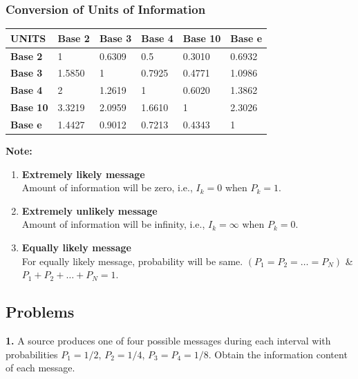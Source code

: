 \documentclass[12pt]{article}
\begin{document}
\subsubsection{Conversion of Units of Information}
\begin{table}[ht]
	\centering
	\renewcommand{\arraystretch}{1.3}
	\begin{tabular}{|l|l|l|l|l|l|}
		\hline
		\rowcolor{black!10}
		\textbf{UNITS}   & \textbf{Base 2} & \textbf{Base 3} & \textbf{Base 4} & \textbf{Base 10} & \textbf{Base e} \\ \hline
		\textbf{Base 2}  & 1               & 0.6309          & 0.5             & 0.3010           & 0.6932          \\ \hline
		\textbf{Base 3}  & 1.5850          & 1               & 0.7925          & 0.4771           & 1.0986          \\ \hline
		\textbf{Base 4}  & 2               & 1.2619          & 1               & 0.6020           & 1.3862          \\ \hline
		\textbf{Base 10} & 3.3219          & 2.0959          & 1.6610          & 1                & 2.3026          \\ \hline
		\textbf{Base e}  & 1.4427          & 0.9012          & 0.7213          & 0.4343           & 1               \\ \hline
	\end{tabular}
\end{table}

\textbf{Note:}
\begin{enumerate}
	\item[i.] \textbf{Extremely likely message}\\
	      Amount of information will be zero, i.e., $I_k = 0$ when $P_k = 1$.
	\item[ii.] \textbf{Extremely unlikely message}\\
	      Amount of information will be infinity, i.e., $I_k = \infty$ when $P_k = 0$.
	\item[iii.] \textbf{Equally likely message}\\
	      For equally likely message, probability will be same. $(P_1 = P_2 = \ldots = P_N)$ \& $P_1 + P_2 + \ldots + P_N = 1$.
\end{enumerate}

\subsection*{Problems}
\textbf{1.} A source produces one of four possible messages during each interval with probabilities $P_1 = 1/2$, $P_2 = 1/4$, $P_3 = P_4 = 1/8$. Obtain the information content of each message.
\end{document}
